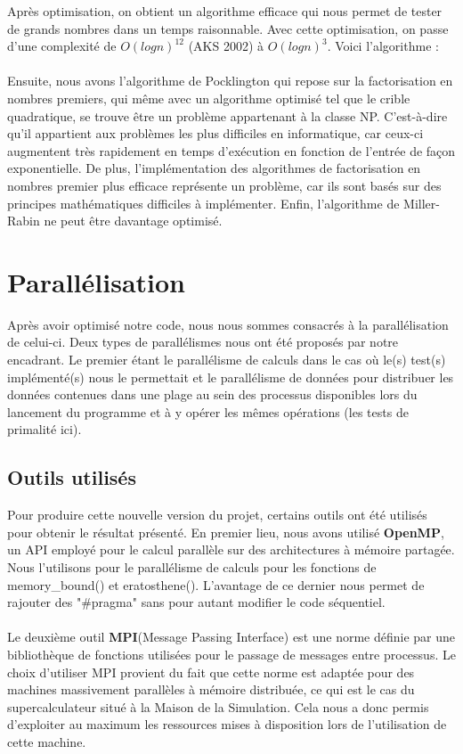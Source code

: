 Après optimisation, on obtient un algorithme efficace qui nous permet de tester de grands nombres dans un temps raisonnable. Avec cette optimisation, on passe d'une complexité de $O (log n)^{12}$ (AKS 2002) à $O (log n)^3$. Voici l'algorithme :

	\paragraph{}Ensuite, nous avons l'algorithme de Pocklington qui repose sur la factorisation en nombres premiers, qui même avec un algorithme optimisé tel que le crible quadratique, se trouve être un problème appartenant à la classe NP. C'est-à-dire qu'il appartient aux problèmes les plus difficiles en informatique, car ceux-ci augmentent très rapidement en temps d'exécution en fonction de l'entrée de façon exponentielle. De plus, l'implémentation des algorithmes de factorisation en nombres premier plus efficace représente un problème, car ils sont basés sur des principes mathématiques difficiles à implémenter. Enfin, l'algorithme de Miller-Rabin ne peut être davantage optimisé.
	

	\section{Parallélisation}
	Après avoir optimisé notre code, nous nous sommes consacrés à la parallélisation de celui-ci. Deux types de parallélismes nous ont été proposés par notre encadrant. Le premier étant le parallélisme de calculs dans le cas où le(s) test(s) implémenté(s) nous le permettait et le parallélisme de données pour distribuer les données contenues dans une plage au sein des processus disponibles lors du lancement du programme et à y opérer les mêmes opérations (les tests de primalité ici).

		\subsection{Outils utilisés}
Pour produire cette nouvelle version du projet, certains outils ont été utilisés pour obtenir le résultat présenté. En premier lieu, nous avons utilisé \textbf{OpenMP}\cite{omp}, un API employé pour le calcul parallèle sur des architectures à mémoire partagée. Nous l'utilisons pour le parallélisme de calculs pour les fonctions de memory\_bound() et eratosthene(). L'avantage de ce dernier nous permet de rajouter des "\#pragma" sans pour autant modifier le code séquentiel.

		\paragraph{}Le deuxième outil \textbf{MPI}(Message Passing Interface)\cite{MPI} est une norme définie par une bibliothèque de fonctions utilisées pour le passage de messages entre processus. Le choix d'utiliser MPI provient du fait que cette norme est adaptée pour des machines massivement parallèles à mémoire distribuée, ce qui est le cas du supercalculateur situé à la Maison de la Simulation. Cela nous a donc permis d'exploiter au maximum les ressources mises à disposition lors de l'utilisation de cette machine. 
		
